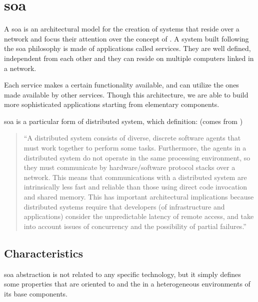 %
%
\section{\acf{soa}}
\label{sec:architecture-soa}
A \acf{soa} is an architectural model for the creation of systems that reside over a network and
focus their attention over the concept of . A system built following the \ac{soa}
philosophy is made of applications called services. They are well defined, independent from each
other and they can reside on multiple computers linked in a network.

Each service makes a certain functionality available, and can utilize the ones made available by other
services. Though this architecture, we are able to build more sophisticated applications starting from
elementary components.

\ac{soa} is a particular form of distributed system, which definition: (comes from \cite{distributedSystem})

\begin{center}
	\begin{quote}
		``A distributed system consists of diverse, discrete software agents that must work together to perform
		some tasks. Furthermore, the agents in a distributed system do not operate in the same processing
		environment, so they must communicate by hardware/software protocol stacks over a network. This
		means that communications with a distributed system are intrinsically less fast and reliable than
		those using direct code invocation and shared memory. This has important architectural implications
		because distributed systems require that developers (of infrastructure and applications) consider
		the unpredictable latency of remote access, and take into account issues of concurrency and the
		possibility of partial failures.''
	\end{quote}
\end{center}

\subsection{Characteristics}
\label{sec:architecture-soa-characteristics}
\ac{soa} abstraction is not related to any specific technology, but it simply defines some properties 
that are oriented to  and the  in a heterogeneous environments of its
base components.

